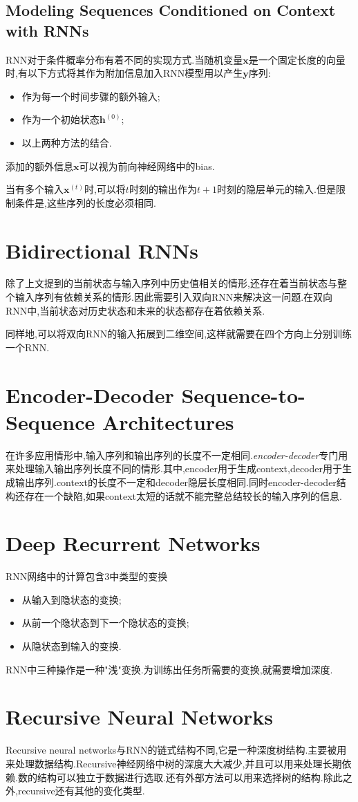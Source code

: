 \subsection{Modeling Sequences Conditioned on Context with RNNs}

RNN对于条件概率分布有着不同的实现方式.当随机变量$\mathbf x$是一个固定长度的向量时,有以下方式将其作为附加信息加入RNN模型用以产生$\mathbf y$序列:
\begin{itemize}
    \item 作为每一个时间步骤的额外输入;
    \item 作为一个初始状态$\mathbf h^{(0)}$;
    \item 以上两种方法的结合.
\end{itemize}
添加的额外信息$\mathbf x$可以视为前向神经网络中的bias.

当有多个输入$\mathbf x^{(t)}$时,可以将$t$时刻的输出作为$t+1$时刻的隐层单元的输入.但是限制条件是,这些序列的长度必须相同.

\section{Bidirectional RNNs}

除了上文提到的当前状态与输入序列中历史值相关的情形,还存在着当前状态与整个输入序列有依赖关系的情形.因此需要引入双向RNN来解决这一问题.在双向RNN中,当前状态对历史状态和未来的状态都存在着依赖关系.

同样地,可以将双向RNN的输入拓展到二维空间,这样就需要在四个方向上分别训练一个RNN.

\section{Encoder-Decoder Sequence-to-Sequence Architectures}

在许多应用情形中,输入序列和输出序列的长度不一定相同.\textit{encoder-decoder}专门用来处理输入输出序列长度不同的情形.其中,encoder用于生成context,decoder用于生成输出序列.context的长度不一定和decoder隐层长度相同.同时encoder-decoder结构还存在一个缺陷,如果context太短的话就不能完整总结较长的输入序列的信息.

\section{Deep Recurrent Networks}

RNN网络中的计算包含3中类型的变换
\begin{itemize}
    \item 从输入到隐状态的变换;
    \item 从前一个隐状态到下一个隐状态的变换;
    \item 从隐状态到输入的变换.
\end{itemize}
RNN中三种操作是一种"浅"变换.为训练出任务所需要的变换,就需要增加深度.

\section{Recursive Neural Networks}

Recursive neural networks与RNN的链式结构不同,它是一种深度树结构.主要被用来处理数据结构.Recursive神经网络中树的深度大大减少,并且可以用来处理长期依赖.数的结构可以独立于数据进行选取.还有外部方法可以用来选择树的结构.除此之外,recursive还有其他的变化类型.